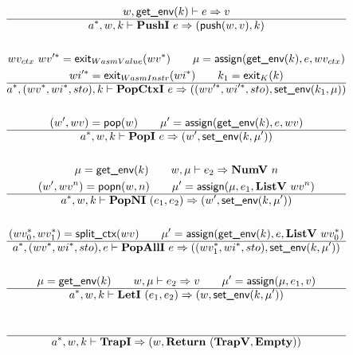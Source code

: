 \begin{gather*}
  w, \getenv(k) \vdash e \Rightarrow v \\
  \hline
  \seq{a}, w, k \vdash \pushi ~ e \Rightarrow (\push(w, v), k) \\
%
\newline \\
  wv_{ctx} ~ \seq{wv'} = \exit_{WasmValue}(\seq{wv}) \qquad
  \mu = \assign(\getenv(k), e, wv_{ctx}) \\
  \seq{wi'} = \exit_{WasmInstr}(\seq{wi}) \qquad
  k_1 = \exit_{K}(k) \\
  \hline
  \seq{a}, (\seq{wv}, \seq{wi}, sto), k \vdash \popctxi ~ e
  \Rightarrow
  ((\seq{wv'}, \seq{wi'}, sto), \setenv(k_1, \mu)) \\
%
\newline \\
  (w', wv) = \pop(w) \qquad
  \mu' = \assign(\getenv(k), e, wv) \\
  \hline
  \seq{a}, w, k \vdash \popi ~ e \Rightarrow (w', \setenv(k, \mu')) \\
%
\newline \\
  \mu = \getenv(k) \qquad
  w, \mu \vdash e_2 \Rightarrow \numv ~ n \\
  (w', wv^n) = \popn(w, n) \qquad
  \mu' = \assign(\mu, e_1, \listv ~ wv^n) \\
  \hline
  \seq{a}, w, k \vdash \popni ~ (e_1, e_2) \Rightarrow (w', \setenv(k, \mu')) \\
%
\newline \\
  (\seq{wv_0}, \seq{wv_1}) = \splitctx(wv) \qquad
  \mu' = \assign(\getenv(k), e, \listv ~ \seq{wv_0}) \\
  \hline
  \seq{a}, (\seq{wv}, \seq{wi}, sto), e \vdash \popalli ~ e
  \Rightarrow
  ((\seq{wv_1}, \seq{wi}, sto), \setenv(k, \mu')) \\
%
\newline \\
  \mu = \getenv(k) \qquad
  w, \mu \vdash e_2 \Rightarrow v \qquad
  \mu' = \assign(\mu, e_1, v) \\
  \hline
  \seq{a}, w, k \vdash \leti ~ (e_1, e_2)
  \Rightarrow
  (w, \setenv(k, \mu')) \\
%
\newline \\
  \\
  \hline
  \seq{a}, w, k \vdash \trapi \Rightarrow (w, \ret ~ (\trapv, \mt)) \\
%

\end{gather*}
